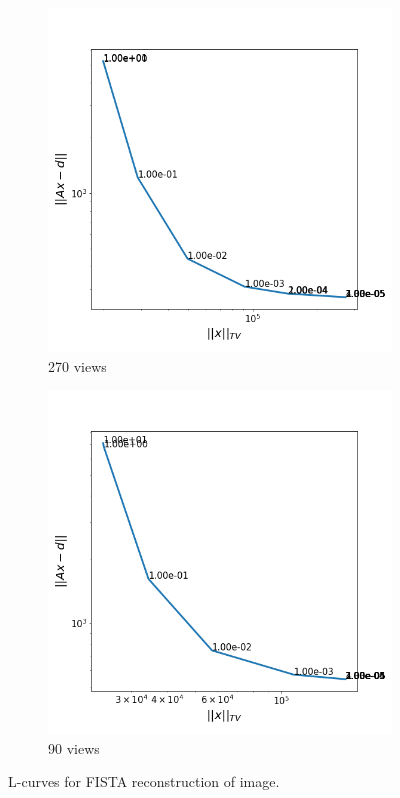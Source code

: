 \documentclass[11pt]{article}
\begin{document}
\begin{figure}[h]
\begin{subfigure}[t]{0.3\textwidth}
		\includegraphics[width=\linewidth]{results/fista270Lcurve.png}
		\caption{270 views}
		\label{fig:lcurve270}
	\end{subfigure}
	\hfill
	\begin{subfigure}[t]{0.3\textwidth}
		\includegraphics[width=\linewidth]{results/fistaFullLcurve.png}
		\caption{90 views}
		\label{fig:lcurve90}
	\end{subfigure}
	
	\caption{L-curves for FISTA reconstruction of image.}
	\label{fig:lcurves}
\end{figure}
\end{document}
